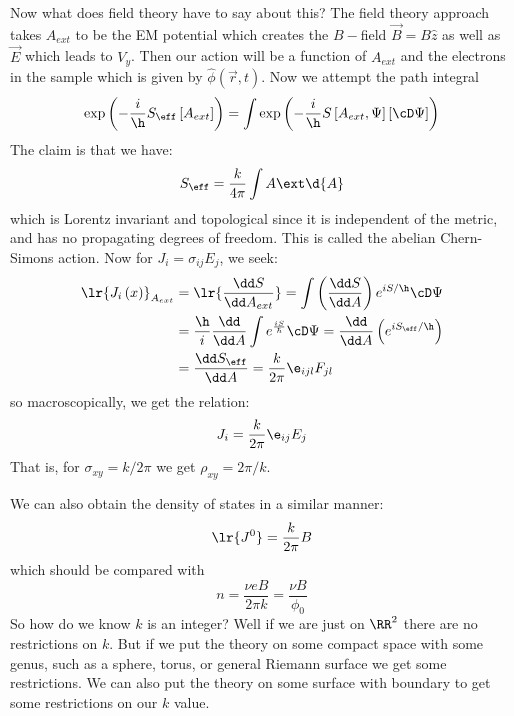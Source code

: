\documentclass{booc}
\begin{document}
Now what does field theory have to say about this?
The field theory approach takes $A_{ext}$ to be the EM potential
which creates the $B-$field $\vec{B} = B\hat z$
as well as $\vec{E}$ which leads to $V_y$. 
Then our action will be a function of $A_{ext}$ and the electrons in the sample
which is given by $\hat \phi\left( \vec{r} , t \right)$. 
Now we attempt the path integral
\begin{equation}
\exp\left( -\frac{i}{\h}S_\eff \left[ A_{ext} \right] \right)=
\int \exp\left( -\frac{i}{\h} S\left[ A_{ext} , \Psi \right]\left[ \cD \Psi \right]\right)
\end{equation}
The claim is that we have:
\begin{equation}
S_\eff = \frac{k}{4\pi} \int A \ext \d{A}
\end{equation}
which is Lorentz invariant and topological since it is
independent of the metric, and has no propagating degrees of freedom.
This is called the abelian Chern-Simons action.
Now for $J_i = \sigma_{ij} E_j$, we seek:
\begin{align}
\lr{J_i\left( x \right)}_{A_{ext}} &= 
\lr{\frac{\dd S}{\dd A_{ext}}}
= \int \left( \frac{\dd S}{\dd A} \right)e^{iS /\h} \cD \Psi
\\
&= \frac{\h}{i} \frac{\dd}{\dd A}
\int e^{\frac{i S}{\hbar}} \cD \Psi 
= \frac{\dd}{\dd A}\left( e^{iS_\eff / \h }\right)
\\
&= \frac{\dd S_\eff}{\dd A} = 
\frac{k}{2\pi} \e_{ijl} F_{jl}
\end{align}
so macroscopically, we get the relation:
\begin{equation}
J_i = \frac{k}{2\pi} \e_{ij} E_j
\end{equation}
That is, for $\sigma_{xy} = k / 2\pi$ we get $\rho_{xy} = 2\pi / k$. 

We can also obtain the density of states in a similar manner:
\begin{align}
\lr{J^0} = \frac{k}{2\pi} B
\end{align}
which should be compared with
\begin{equation}
n= \frac{\nu e B}{2\pi k} = \frac{\nu B}{\phi_0}
\end{equation}
So how do we know $k$ is an integer?
Well if we are just on $\RR^2$ there are no restrictions on $k$. 
But if we put the theory on some compact space with some genus, such as a sphere, 
torus, or general Riemann surface we get some restrictions.
We can also put the theory on some surface with boundary to get some restrictions on our $k$ value.
\end{document}
